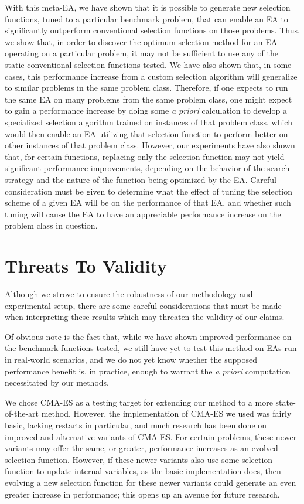 \documentclass[sigconf]{acmart}
\begin{document}
With this meta-EA, we have shown that it is possible to generate new selection functions, tuned to a particular benchmark problem, that can enable an EA to significantly outperform conventional selection functions on those problems. Thus, we show that, in order to discover the optimum selection method for an EA operating on a particular problem, it may not be sufficient to use any of the static conventional selection functions tested. We have also shown that, in some cases, this performance increase from a custom selection algorithm will generalize to similar problems in the same problem class. Therefore, if one expects to run the same EA on many problems from the same problem class, one might expect to gain a performance increase by doing some \textit{a priori} calculation to develop a specialized selection algorithm trained on instances of that problem class, which would then enable an EA utilizing that selection function to perform better on other instances of that problem class. However, our experiments have also shown that, for certain functions, replacing only the selection function may not yield significant performance improvements, depending on the behavior of the search strategy and the nature of the function being optimized by the EA. Careful consideration must be given to determine what the effect of tuning the selection scheme of a given EA will be on the performance of that EA, and whether such tuning will cause the EA to have an appreciable performance increase on the problem class in question. 

\section{Threats To Validity}
\label{Threats to Validity}
Although we strove to ensure the robustness of our methodology and experimental setup, there are some careful considerations that must be made when interpreting these results which may threaten the validity of our claims.

Of obvious note is the fact that, while we have shown improved performance on the benchmark functions tested, we still have yet to test this method on EAs run in real-world scenarios, and we do not yet know whether the supposed performance benefit is, in practice, enough to warrant the \textit{a priori} computation necessitated by our methods.

We chose CMA-ES as a testing target for extending our method to a more state-of-the-art method. However, the implementation of CMA-ES we used was fairly basic, lacking restarts in particular, and much research has been done on improved and alternative variants of CMA-ES. For certain problems, these newer variants may offer the same, or greater, performance increases as an evolved selection function. However, if these newer variants also use some selection function to update internal variables, as the basic implementation does, then evolving a new selection function for these newer variants could generate an even greater increase in performance; this opens up an avenue for future research.
\end{document}
